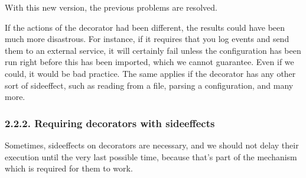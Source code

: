 \documentclass[a4paper,10pt,english]{sphinxmanual}
\begin{document}
\begin{sphinxVerbatim}[commandchars=\\\{\}]
 
      
         
          
           
              
         
     
\end{sphinxVerbatim}

With this new version, the previous problems are resolved.

If the actions of the decorator had been different, the results could have been much more
disastrous. For instance, if it requires that you log events and send them to an external
service, it will certainly fail unless the configuration has been run right before this has been
imported, which we cannot guarantee. Even if we could, it would be bad practice. The
same applies if the decorator has any other sort of side\sphinxhyphen{}effect, such as reading from a file,
parsing a configuration, and many more.


\subsubsection{2.2.2. Requiring decorators with side\sphinxhyphen{}effects}
\label{\detokenize{chapters/5_decorators/index:requiring-decorators-with-side-effects}}
Sometimes, side\sphinxhyphen{}effects on decorators are necessary, and we should not delay their
execution until the very last possible time, because that’s part of the mechanism which is
required for them to work.
\end{document}
